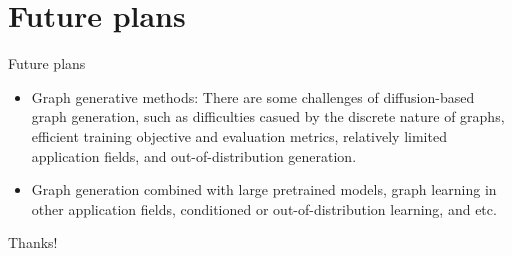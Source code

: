 \documentclass{beamer}
\begin{document}
\section{Future plans}
\begin{frame}{Future plans}
    \begin{itemize}
        \item Graph generative methods: There are some challenges of diffusion-based graph generation, such as difficulties casued by the discrete nature of graphs, efficient training objective and evaluation metrics, relatively limited application fields, and out-of-distribution generation.
        \item Graph generation combined with large pretrained models, graph learning in other application fields, conditioned or out-of-distribution learning, and etc.
    \end{itemize}
\end{frame}


\begin{frame}
    \begin{center}
        {\Huge\calligra Thanks!}
    \end{center}
\end{frame}
\end{document}
